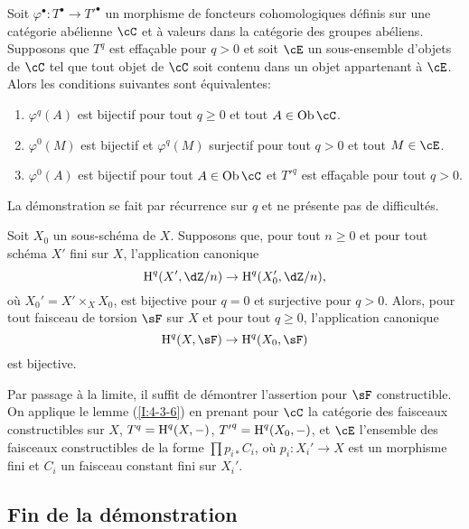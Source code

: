 \begin{lemma}\label{I:4-3-6}
Soit $\varphi^\bullet:T^\bullet\to {T'}^\bullet$ un morphisme de foncteurs 
cohomologiques définis sur une catégorie abélienne $\cC$ et à valeurs 
dans la catégorie des groupes abéliens. Supposons que $T^q$ est effaçable 
pour $q>0$ et soit $\cE$ un sous-ensemble d'objets de $\cC$ tel que tout objet 
de $\cC$ soit contenu dans un objet appartenant à $\cE$. Alors les 
conditions suivantes sont équivalentes:
\begin{enumerate}[\indent (i)]
  \item $\varphi^q(A)$ est bijectif pour tout $q\geqslant 0$ et tout 
    $A\in\ob \cC$.
  \item $\varphi^0(M)$ est bijectif et $\varphi^q(M)$ surjectif pour tout 
    $q>0$ et tout $M\in\cE$. 
  \item $\varphi^0(A)$ est bijectif pour tout $A\in\ob \cC$ et ${T'}^q$ est 
    effaçable pour tout $q>0$. 
\end{enumerate}
\end{lemma}

La démonstration se fait par récurrence sur $q$ et ne présente pas de 
difficultés. 





\begin{proposition}\label{I:4-3-7}
Soit $X_0$ un sous-schéma de $X$. Supposons que, pour tout $n\geqslant 0$ et 
pour tout schéma $X'$ fini sur $X$, l'application canonique 
\[
  \h^q(X',\dZ/n) \to \h^q(X_0',\dZ/n)\text{,}
\]
où $X_0' = X'\times_X X_0$, est bijective pour $q=0$ et surjective pour 
$q>0$. Alors, pour tout faisceau de torsion $\sF$ sur $X$ et pour tout 
$q\geqslant 0$, l'application canonique 
\[
  \h^q(X,\sF) \to \h^q(X_0,\sF)
\]
est bijective.
\end{proposition}

Par passage à la limite, il suffit de démontrer l'assertion pour $\sF$ 
constructible. On applique le lemme (\ref{I:4-3-6}) en prenant pour $\cC$ la 
catégorie des faisceaux constructibles sur $X$, $T^q=\operatorname{H}^q(X,-)$, 
${T'}^q=\operatorname{H}^q(X_0,-)$, et $\cE$ l'ensemble des faisceaux constructibles de la 
forme $\prod p_{i*} C_i$, où $p_i:X_i'\to X$ est un morphisme fini et $C_i$ 
un faisceau constant fini sur $X_i'$. 










\subsection{Fin de la démonstration}\label{I:4-4}

